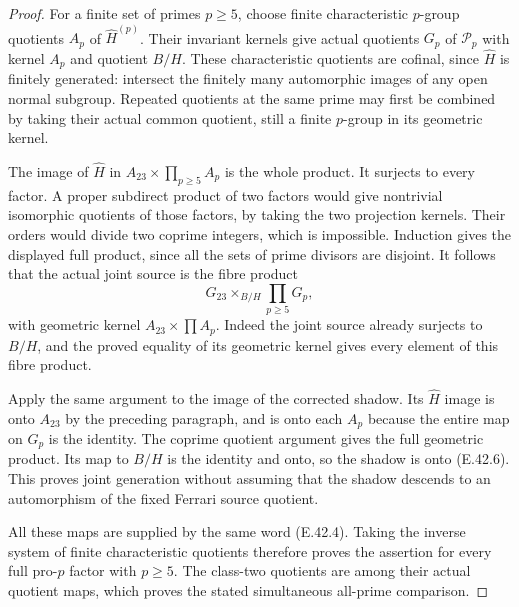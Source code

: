 \begin{proof}
For a finite set of primes $p\ge5$,
choose finite characteristic $p$-group
quotients $A_p$ of $\widehat H^{(p)}$.
Their invariant kernels give actual
quotients $G_p$ of $\mathscr P_p$ with
kernel $A_p$ and quotient $B/H$.
These characteristic quotients are
cofinal, since $\widehat H$ is finitely
generated: intersect the finitely many
automorphic images of any open normal
subgroup.
Repeated quotients at the same prime
may first be combined by taking their
actual common quotient, still a finite
$p$-group in its geometric kernel.

The image of $\widehat H$ in
$A_{23}\times\prod_{p\ge5}A_p$ is the
whole product.  It surjects to every
factor.  A proper subdirect product of
two factors would give nontrivial
isomorphic quotients of those factors,
by taking the two projection kernels.
Their orders would divide two coprime
integers, which is impossible.
Induction gives the displayed full
product, since all the sets of prime
divisors are disjoint.
It follows that the actual joint source
is the fibre product
\[
       G_{23}\mathop{\times}_{B/H}
                         \prod_{p\ge5}G_p,
 \tag{E.42.6}
\]
with geometric kernel
$A_{23}\times\prod A_p$.
Indeed the joint source already surjects
to $B/H$, and the proved equality of
its geometric kernel gives every element
of this fibre product.

Apply the same argument to the image of
the corrected shadow.
Its $\widehat H$ image is onto $A_{23}$
by the preceding paragraph, and is onto
each $A_p$ because the entire map on
$G_p$ is the identity.
The coprime quotient argument gives
the full geometric product.
Its map to $B/H$ is the identity and
onto, so the shadow is onto
\textup{(E.42.6)}.
This proves joint generation without
assuming that the shadow descends to
an automorphism of the fixed Ferrari
source quotient.

All these maps are supplied by the same
word \textup{(E.42.4)}.
Taking the inverse system of finite
characteristic quotients therefore
proves the assertion for every full
pro-$p$ factor with $p\ge5$.
The class-two quotients are among their
actual quotient maps, which proves the
stated simultaneous all-prime comparison.
\end{proof}
